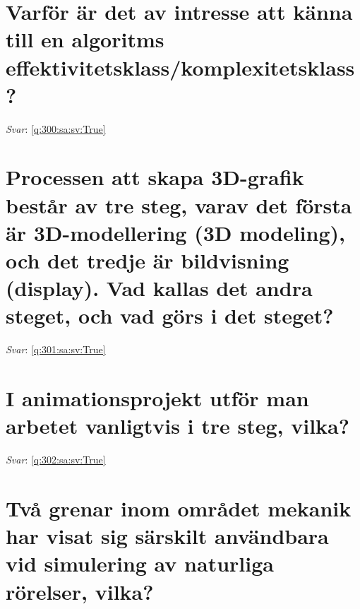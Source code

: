 \documentclass[a4paper,11pt,oneside]{book}
\begin{document}
\begin{sloppypar}
\section{Varf\"or \"ar det av intresse att k\"anna till en algoritms effektivitetsklass/komplexitetsklass?}

\label{q:300:sa:sv:False}

\vspace{2cm}

\noindent\makebox[\textwidth]{\hrulefill}

\vspace{1cm}

\textit{Svar}: \autoref{q:300:sa:sv:True}



\section{Processen att skapa 3D-grafik best\r{a}r av tre steg, varav det f\"orsta \"ar 3D-modellering (3D modeling), och det tredje \"ar bildvisning (display). Vad kallas det andra steget, och vad g\"ors i det steget?}

\label{q:301:sa:sv:False}

\vspace{2cm}

\noindent\makebox[\textwidth]{\hrulefill}

\vspace{1cm}

\textit{Svar}: \autoref{q:301:sa:sv:True}



\section{I animationsprojekt utf\"or man arbetet vanligtvis i tre steg, vilka?}

\label{q:302:sa:sv:False}

\vspace{2cm}

\noindent\makebox[\textwidth]{\hrulefill}

\vspace{1cm}

\textit{Svar}: \autoref{q:302:sa:sv:True}



\section{Tv\r{a} grenar inom omr\r{a}det mekanik har visat sig s\"arskilt anv\"andbara vid simulering av naturliga r\"orelser, vilka?}


\end{sloppypar}
\end{document}
